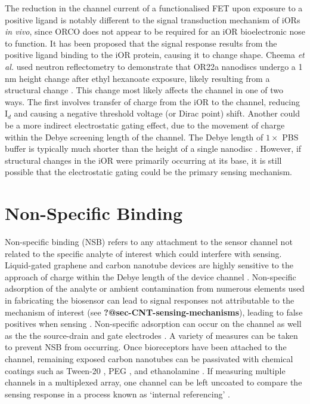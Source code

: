 \documentclass[
  a4paper,
]{scrbook}
\begin{document}
The reduction in the channel current of a functionalised FET upon
exposure to a positive ligand is notably different to the signal
transduction mechanism of iORs \emph{in vivo}, since ORCO does not
appear to be required for an iOR bioelectronic nose to function. It has
been proposed that the signal response results from the positive ligand
binding to the iOR protein, causing it to change shape. Cheema \emph{et
al.} used neutron reflectometry to demonstrate that OR22a nanodiscs
undergo a 1 nm height change after ethyl hexanoate exposure, likely
resulting from a structural change \autocite{Cheema2021}. This change
most likely affects the channel in one of two ways. The first involves
transfer of charge from the iOR to the channel, reducing I\(_{d}\) and
causing a negative threshold voltage (or Dirac point) shift. Another
could be a more indirect electrostatic gating effect, due to the
movement of charge within the Debye screening length of the channel. The
Debye length of \(1 \times\) PBS buffer is typically much shorter than
the height of a single nanodisc \autocite{Murugathas2019a}. However, if
structural changes in the iOR were primarily occurring at its base, it
is still possible that the electrostatic gating could be the primary
sensing mechanism.

\hypertarget{sec-non-specific-binding}{%
\section{Non-Specific Binding}\label{sec-non-specific-binding}}

Non-specific binding (NSB) refers to any attachment to the sensor
channel not related to the specific analyte of interest which could
interfere with sensing. Liquid-gated graphene and carbon nanotube
devices are highly sensitive to the approach of charge within the Debye
length of the device channel \autocite{Shkodra2021}. Non-specific
adsorption of the analyte or ambient contamination from numerous
elements used in fabricating the biosensor can lead to signal responses
not attributable to the mechanism of interest (see
\textbf{?@sec-CNT-sensing-mechanisms}), leading to false positives when
sensing \autocite{Chen2004,Star2003a,Shkodra2021}. Non-specific
adsorption can occur on the channel as well as the the source-drain and
gate electrodes \autocite{Chen2004}. A variety of measures can be taken
to prevent NSB from occurring. Once bioreceptors have been attached to
the channel, remaining exposed carbon nanotubes can be passivated with
chemical coatings such as Tween-20 \autocite{Chen2004}, PEG
\autocite{Star2003a}, and ethanolamine \autocite{Maehashi2007,Das2011}.
If measuring multiple channels in a multiplexed array, one channel can
be left uncoated to compare the sensing response in a process known as
`internal referencing' \autocite{Shkodra2021}.
\end{document}

